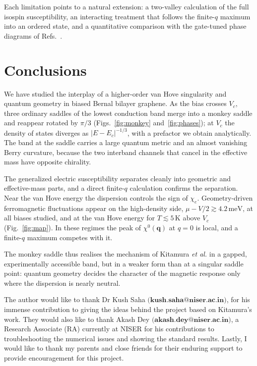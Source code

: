 \documentclass[aps,prb,twocolumn,superscriptaddress,floatfix,nofootinbib]{revtex4-2}
\newcommand{\bq}{\mathbf{q}}
\newcommand{\chie}{\chi_{e}}
\newcommand{\meV}{\,\mathrm{meV}}
\begin{document}
Each limitation points to a natural extension: a two-valley calculation of the full isospin susceptibility, an interacting treatment that follows the finite-$q$ maximum into an ordered state, and a quantitative comparison with the gate-tuned phase diagrams of Refs.~\cite{Zhou2022,Seiler2022,delaBarrera2022}.

\section{Conclusions}\label{sec:conclusions}

We have studied the interplay of a higher-order van Hove singularity and quantum geometry in biased Bernal bilayer graphene. As the bias crosses $V_c$, three ordinary saddles of the lowest conduction band merge into a monkey saddle and reappear rotated by $\pi/3$ (Figs.~\ref{fig:monkey} and~\ref{fig:phases}); at $V_c$ the density of states diverges as $|E-E_c|^{-1/3}$, with a prefactor we obtain analytically. The band at the saddle carries a large quantum metric and an almost vanishing Berry curvature, because the two interband channels that cancel in the effective mass have opposite chirality.

The generalized electric susceptibility separates cleanly into geometric and effective-mass parts, and a direct finite-$q$ calculation confirms the separation. Near the van Hove energy the dispersion controls the sign of $\chie$. Geometry-driven ferromagnetic fluctuations appear on the high-density side, $\mu-V/2\gtrsim4.2\meV$, at all biases studied, and at the van Hove energy for $T\lesssim5\,$K above $V_c$ (Fig.~\ref{fig:map}). In these regimes the peak of $\chi^0(\bq)$ at $q=0$ is local, and a finite-$q$ maximum competes with it.

The monkey saddle thus realises the mechanism of Kitamura \emph{et al.} in a gapped, experimentally accessible band, but in a weaker form than at a singular saddle point: quantum geometry decides the character of the magnetic response only where the dispersion is nearly neutral.

\begin{acknowledgments}
The author would like to thank Dr Kush Saha $\textbf{(kush.saha@niser.ac.in)}$,  for his immense contribution to giving the ideas behind the project based on Kitamura's work. They would also like to thank Akash Dey $
\textbf{(akash.dey@niser.ac.in)}$, a Research Associate (RA) currently at NISER for his contributions to troubleshooting the numerical issues and showing the standard results. Lastly, I would like to thank my parents and close friends for their enduring support to provide encouragement for this project.
\end{acknowledgments}
\end{document}

